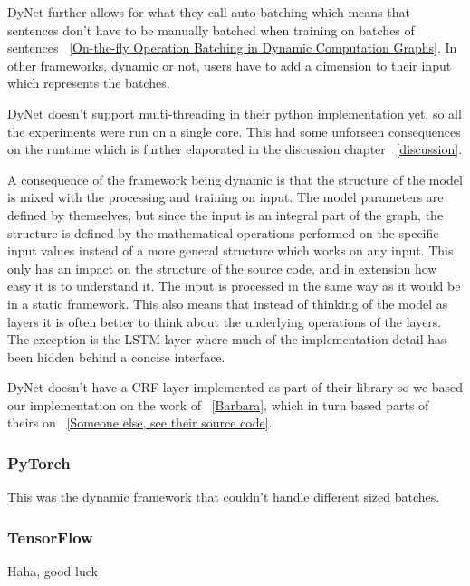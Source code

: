 DyNet further allows for what they call auto-batching which means that sentences
don't have to be manually batched when training on batches of sentences
~\ref{On-the-fly Operation Batching in Dynamic Computation Graphs}. In other
frameworks, dynamic or not, users have to add a dimension to their input which
represents the batches.

DyNet doesn't support multi-threading in their python implementation yet, so all
the experiments were run on a single core. This had some unforseen consequences
on the runtime which is further elaporated in the discussion chapter
~\ref{discussion}.

A consequence of the framework being dynamic is that the structure of the model
is mixed with the processing and training on input. The model parameters are
defined by themselves, but since the input is an integral part of the graph, the
structure is defined by the mathematical operations performed on the specific
input values instead of a more general structure which works on any input. This
only has an impact on the structure of the source code, and in extension how
easy it is to understand it. The input is processed in the same way as it would
be in a static framework. This also means that instead of thinking of the model
as layers it is often better to think about the underlying operations of the
layers. The exception is the LSTM layer where much of the implementation detail
has been hidden behind a concise interface.

DyNet doesn't have a CRF layer implemented as part of their library so we based
our implementation on the work of ~\ref{Barbara}, which in turn based parts of
theirs on ~\ref{Someone else, see their source code}. 


\subsubsection*{PyTorch}

This was the dynamic framework that couldn't handle different sized batches.


\subsubsection*{TensorFlow}

Haha, good luck



